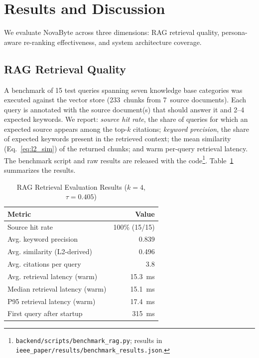 \documentclass[conference]{IEEEtran}
\begin{document}
\section{Results and Discussion}

We evaluate NovaByte across three dimensions: RAG retrieval quality, persona-aware re-ranking effectiveness, and system architecture coverage.

\subsection{RAG Retrieval Quality}

A benchmark of 15 test queries spanning seven knowledge base categories was executed against the vector store (233~chunks from 7~source documents). Each query is annotated with the source document(s) that should answer it and 2--4 expected keywords. We report: \emph{source hit rate}, the share of queries for which an expected source appears among the top-$k$ citations; \emph{keyword precision}, the share of expected keywords present in the retrieved context; the mean similarity (Eq.~\ref{eq:l2_sim}) of the returned chunks; and warm per-query retrieval latency. The benchmark script and raw results are released with the code\footnote{\texttt{backend/scripts/benchmark\_rag.py}; results in \texttt{ieee\_paper/results/benchmark\_results.json}.}. Table~\ref{tab:retrieval} summarizes the results.

\begin{table}[htbp]
\centering
\caption{RAG Retrieval Evaluation Results ($k=4$, $\tau=0.405$)}
\label{tab:retrieval}
\begin{tabular}{l r}
\toprule
\textbf{Metric} & \textbf{Value} \\
\midrule
Source hit rate & 100\% (15/15) \\
Avg. keyword precision & 0.839 \\
Avg. similarity (L2-derived) & 0.496 \\
Avg. citations per query & 3.8 \\
Avg. retrieval latency (warm) & 15.3~ms \\
Median retrieval latency (warm) & 15.1~ms \\
P95 retrieval latency (warm) & 17.4~ms \\
First query after startup & 315~ms \\
\bottomrule
\end{tabular}
\end{table}
\end{document}
